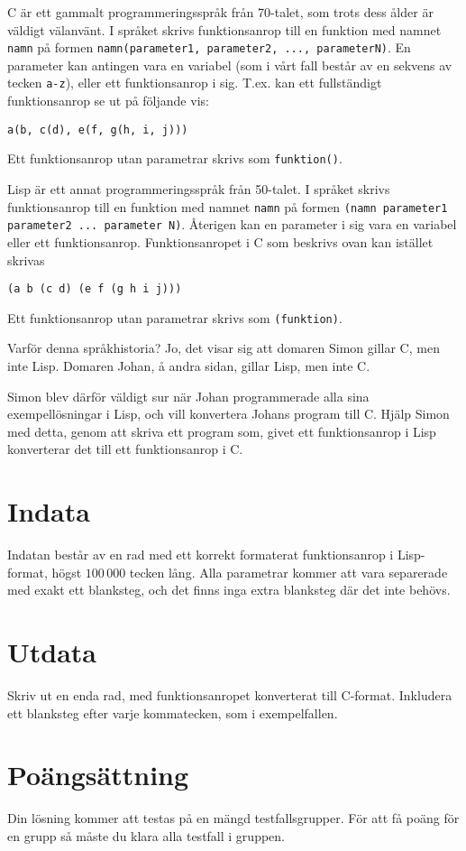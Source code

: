 C är ett gammalt programmeringsspråk från 70-talet, som trots dess ålder är väldigt välanvänt.
I språket skrivs funktionsanrop till en funktion med namnet \texttt{namn} på formen \texttt{namn(parameter1, parameter2, ..., parameterN)}.
En parameter kan antingen vara en variabel (som i vårt fall består av en sekvens av tecken \texttt{a-z}), eller ett funktionsanrop i sig.
T.ex. kan ett fullständigt funktionsanrop se ut på följande vis:
\begin{verbatim}
a(b, c(d), e(f, g(h, i, j)))
\end{verbatim}
Ett funktionsanrop utan parametrar skrivs som \texttt{funktion()}.

Lisp är ett annat programmeringsspråk från 50-talet.
I språket skrivs funktionsanrop till en funktion med namnet \texttt{namn} på formen \texttt{(namn parameter1 parameter2 ... parameter N)}.
Återigen kan en parameter i sig vara en variabel eller ett funktionsanrop.
Funktionsanropet i C som beskrivs ovan kan istället skrivas
\begin{verbatim}
(a b (c d) (e f (g h i j)))
\end{verbatim}
Ett funktionsanrop utan parametrar skrivs som \texttt{(funktion)}.

Varför denna språkhistoria?
Jo, det visar sig att domaren Simon gillar C, men inte Lisp.
Domaren Johan, å andra sidan, gillar Lisp, men inte C.

Simon blev därför väldigt sur när Johan programmerade alla sina exempellösningar i Lisp, och vill konvertera Johans program till C.
Hjälp Simon med detta, genom att skriva ett program som, givet ett funktionsanrop i Lisp konverterar det till ett funktionsanrop i C.

\section*{Indata}
Indatan består av en rad med ett korrekt formaterat funktionsanrop i Lisp-format, högst $100\,000$ tecken lång.
Alla parametrar kommer att vara separerade med exakt ett blanksteg, och det finns inga extra blanksteg där det inte behövs.

\section*{Utdata}
Skriv ut en enda rad, med funktionsanropet konverterat till C-format.
Inkludera ett blanksteg efter varje kommatecken, som i exempelfallen.

\section*{Poängsättning}
Din lösning kommer att testas på en mängd testfallsgrupper. För att få poäng för en grupp så måste du klara alla testfall i gruppen.

